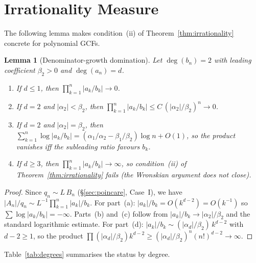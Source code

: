 \documentclass[11pt,a4paper]{article}
\newtheorem{lemma}[theorem]{Lemma}
\theoremstyle{definition}
\theoremstyle{remark}
\newcommand{\abs}[1]{\lvert #1 \rvert}
\begin{document}
\section{Irrationality Measure}\label{sec:mu}

The following lemma makes condition~(ii) of Theorem~\ref{thm:irrationality}
concrete for polynomial GCFs.

\begin{lemma}[Denominator-growth domination]\label{lem:growth_domination}
Let $\deg(b_n) = 2$ with leading coefficient $\beta_2 > 0$
and $\deg(a_n) = d$.
\begin{enumerate}
\item[\emph{(a)}] If $d \leq 1$, then
  $\prod_{k=1}^n \abs{a_k/b_k} \to 0$.
\item[\emph{(b)}] If $d = 2$ and
  $\abs{\alpha_2} < \beta_2$, then
  $\prod_{k=1}^n \abs{a_k/b_k} \leq C\,(\abs{\alpha_2}/\beta_2)^n \to 0$.
\item[\emph{(c)}] If $d = 2$ and
  $\abs{\alpha_2} = \beta_2$, then
  $\sum_{k=1}^n \log\abs{a_k/b_k}
  = (\alpha_1/\alpha_2 - \beta_1/\beta_2) \log n + O(1)$,
  so the product vanishes iff the subleading ratio favours $b_k$.
\item[\emph{(d)}] If $d \geq 3$, then
  $\prod_{k=1}^n \abs{a_k/b_k} \to \infty$,
  so condition~\emph{(ii)} of Theorem~\ref{thm:irrationality} fails
  \textup{(}the Wronskian argument does not close\textup{)}.
\end{enumerate}
\end{lemma}

\begin{proof}
Since $q_n \sim L\, B_n$ (\S\ref{sec:poincare}, Case~I),
we have $\abs{A_n}/q_n \sim L^{-1} \prod_{k=1}^n \abs{a_k}/b_k$.
For part~(a): $\abs{a_k}/b_k = O(k^{d-2}) = O(k^{-1})$ so
$\sum \log\abs{a_k/b_k} = -\infty$.
Parts~(b) and~(c) follow from $\abs{a_k}/b_k \to \abs{\alpha_2}/\beta_2$
and the standard logarithmic estimate.
For part~(d): $\abs{a_k}/b_k \sim (\abs{\alpha_d}/\beta_2)\, k^{d-2}$
with $d-2 \geq 1$, so the product
$\prod (\abs{\alpha_d}/\beta_2) k^{d-2} \geq
(\abs{\alpha_d}/\beta_2)^n (n!)^{d-2} \to \infty$.
\end{proof}

\medskip
Table~\ref{tab:degrees} summarises the status by degree.
\end{document}
